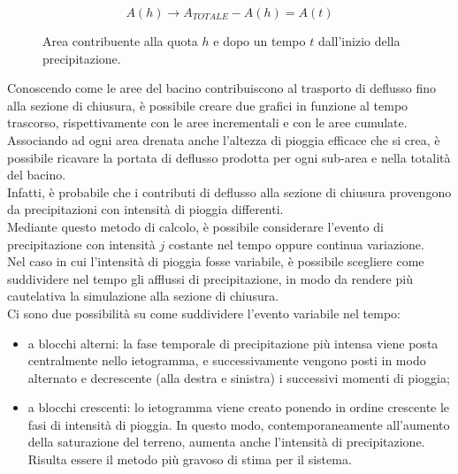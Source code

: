 \begin{figure}[H]
\begin{equation}
    A(h) \rightarrow A_{TOTALE} - A(h) = A(t)
    \label{eq:Acontribuzione_tprecipitazione}
\end{equation}
\caption*{Area contribuente alla quota $h$ e dopo un tempo $t$ dall'inizio della precipitazione.}
\end{figure}

Conoscendo come le aree del bacino contribuiscono al trasporto di deflusso fino alla sezione di chiusura, è possibile creare due grafici in funzione al tempo trascorso, rispettivamente con le aree incrementali e con le aree cumulate.\\
Associando ad ogni area drenata anche l'altezza di pioggia efficace che si crea, è possibile ricavare la portata di deflusso prodotta per ogni sub-area e nella totalità del bacino.\\
Infatti, è probabile che i contributi di deflusso alla sezione di chiusura provengono da precipitazioni con intensità di pioggia differenti.\\
Mediante questo metodo di calcolo, è possibile considerare l'evento di precipitazione con intensità $j$ costante nel tempo oppure continua variazione.\\
Nel caso in cui l'intensità di pioggia fosse variabile, è possibile scegliere come suddividere nel tempo gli afflussi di precipitazione, in modo da rendere più cautelativa la simulazione alla sezione di chiusura.\\
Ci sono due possibilità su come suddividere l'evento variabile nel tempo:
\begin{itemize}
    \item a blocchi alterni: la fase temporale di precipitazione più intensa viene posta centralmente nello ietogramma, e successivamente vengono posti in modo alternato e decrescente (alla destra e sinistra) i successivi momenti di pioggia;
    \item a blocchi crescenti: lo ietogramma viene creato ponendo in ordine crescente le fasi di intensità di pioggia. In questo modo, contemporaneamente all'aumento della saturazione del terreno, aumenta anche l'intensità di precipitazione. Risulta essere il metodo più gravoso di stima per il sistema. 
\end{itemize}

